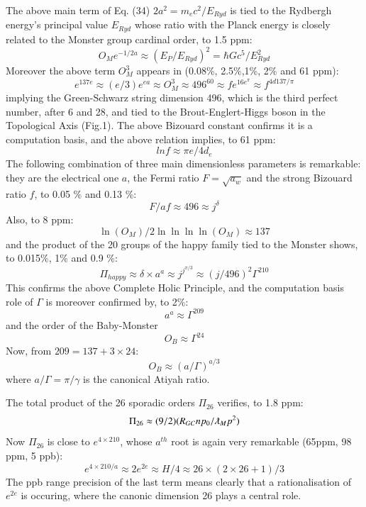 \documentclass[twoside,draft]{article}
\begin{document}
\begin{sloppypar}
{The above main term of Eq. (34) $2a^{2} = m_{e} c^{2}/E_{Ryd}$ is
tied to the Rydbergh energy's principal value $E_{Ryd}$ whose ratio with the Planck energy is closely
related to the Monster group cardinal order, to 1.5 ppm:
\begin{equation}
O_{M} e^{-1/2a} \approx (E_{P} /E_{Ryd})^{2} = \hbar Gc^{5}/E_{Ryd}^{2}
\end{equation}
Moreover the above term $O_M^3$ appears in (0.08\%, 2.5\%,1\%, 2\% and 61 ppm):
\begin{equation}
e^{137e}\approx (e/3)e^{ea}\approx O_M^3 \approx 496^{60} \approx fe^{16e^\pi} \approx f^{4d137/\pi}
\end{equation}
implying the Green-Schwarz string dimension 496, which is the third perfect number, after 6 and 28, and tied to the Brout-Englert-Higgs boson in the Topological Axis (Fig.1). The above Bizouard constant confirms it is a computation basis, and the above relation implies, to 61 ppm:
\begin{equation}
lnf\approx \pi e/4d_e
\end{equation}
The following combination of three main dimensionless parameters is remarkable: they are the electrical
one $a$, the Fermi ratio $F =\sqrt{a_{w}}$ and the strong Bizouard ratio $f$, to 0.05 \% and 0.13 \%:
\begin{equation}
F/af \approx 496\approx j^{\delta}
\end{equation}
Also, to 8 ppm: $$\ln(O_{M}) /2\ln\ln\ln\ln(O_{M}) \approx 137$$ and the product of the 20 groups of the happy family tied
to the Monster shows, to 0.015\%, 1\% and 0.9 \%:
\begin{equation}
\Pi_{happy} \approx \delta \times a^{a} \approx j^{j^{\pi/3}} \approx (j/496)^2 \Gamma^{210}
\end{equation}
This confirms the above Complete Holic Principle, and the computation basis role of $\Gamma$ is moreover confirmed by, to 2\%: $$a^a \approx \Gamma^{209}$$ and the order of the Baby-Monster $$O_B\approx\Gamma^{24}$$ Now, from $209 = 137 + 3\times 24$:
\begin{equation}
O_B \approx (a/\Gamma)^{a/3}
\end{equation}
where $a/\Gamma = \pi/\gamma $ is the canonical Atiyah ratio.

The total product of the 26 sporadic orders $\Pi_{26}$ verifies, to 1.8 ppm:
$$ \Pi_{26} \approx (9/2)(R_{GC}np_0/\lambdabar_M p^2)$$
Now $\Pi_{26}$ is close to $e^{4 \times 210}$, whose $a^{th}$ root is again very remarkable (65ppm, 98 ppm, 5 ppb):
\begin{equation}
e^{4 \times 210/a} \approx 2e^{2e} \approx H/4 \approx 26 \times (2 \times 26 + 1)/3
\end{equation}
The ppb range precision of the last term means clearly that a rationalisation of $e^{2e}$ is occuring, where the canonic dimension 26 plays a central role.

}
\end{sloppypar}
\end{document}
